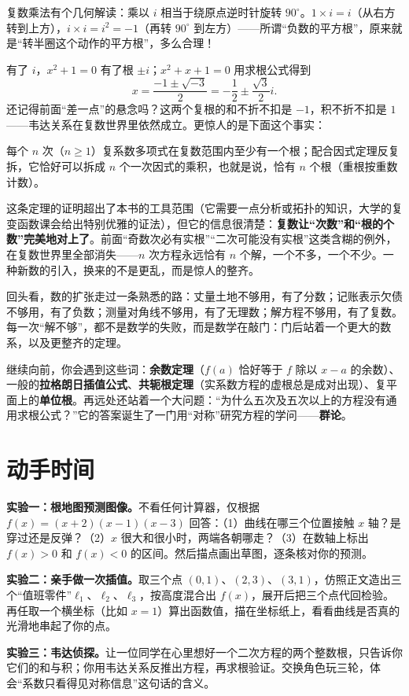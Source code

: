 复数乘法有个几何解读：乘以 $i$ 相当于绕原点逆时针旋转 $90^\circ$。$1\times i = i$（从右方转到上方），$i\times i = i^2 = -1$（再转 $90^\circ$ 到左方）——所谓“负数的平方根”，原来就是“转半圈这个动作的平方根”，多么合理！

有了 $i$，$x^2+1=0$ 有了根 $\pm i$；$x^2+x+1=0$ 用求根公式得到
\[
x=\frac{-1\pm\sqrt{-3}}{2}=-\frac{1}{2}\pm\frac{\sqrt{3}}{2}i.
\]
还记得前面“差一点”的悬念吗？这两个复根的和不折不扣是 $-1$，积不折不扣是 $1$——韦达关系在复数世界里依然成立。更惊人的是下面这个事实：

\begin{dingli}[代数基本定理]
每个 $n$ 次（$n\ge 1$）复系数多项式在复数范围内至少有一个根；配合因式定理反复拆，它恰好可以拆成 $n$ 个一次因式的乘积，也就是说，恰有 $n$ 个根（重根按重数计数）。
\end{dingli}

这条定理的证明超出了本书的工具范围（它需要一点分析或拓扑的知识，大学的复变函数课会给出特别优雅的证法），但它的信息很清楚：\textbf{复数让“次数”和“根的个数”完美地对上了}。前面“奇数次必有实根”“二次可能没有实根”这类含糊的例外，在复数世界里全部消失——$n$ 次方程永远恰有 $n$ 个解，一个不多，一个不少。一种新数的引入，换来的不是更乱，而是惊人的整齐。

回头看，数的扩张走过一条熟悉的路：丈量土地不够用，有了分数；记账表示欠债不够用，有了负数；测量对角线不够用，有了无理数；解方程不够用，有了复数。每一次“解不够”，都不是数学的失败，而是数学在敲门：门后站着一个更大的数系，以及更整齐的定理。

\begin{pandeng}
继续向前，你会遇到这些词：\textbf{余数定理}（$f(a)$ 恰好等于 $f$ 除以 $x-a$ 的余数）、一般的\textbf{拉格朗日插值公式}、\textbf{共轭根定理}（实系数方程的虚根总是成对出现）、复平面上的\textbf{单位根}。再远处还站着一个大问题：“为什么五次及五次以上的方程没有通用求根公式？”它的答案诞生了一门用“对称”研究方程的学问——\textbf{群论}。
\end{pandeng}

\section{动手时间}

\begin{shiyan}
\textbf{实验一：根地图预测图像。}不看任何计算器，仅根据 $f(x)=(x+2)(x-1)(x-3)$ 回答：（1）曲线在哪三个位置接触 $x$ 轴？是穿过还是反弹？（2）$x$ 很大和很小时，两端各朝哪走？（3）在数轴上标出 $f(x)>0$ 和 $f(x)<0$ 的区间。然后描点画出草图，逐条核对你的预测。

\textbf{实验二：亲手做一次插值。}取三个点 $(0,1)$、$(2,3)$、$(3,1)$，仿照正文造出三个“值班零件”$\ell_1$、$\ell_2$、$\ell_3$，按高度混合出 $f(x)$，展开后把三个点代回检验。再任取一个横坐标（比如 $x=1$）算出函数值，描在坐标纸上，看看曲线是否真的光滑地串起了你的点。

\textbf{实验三：韦达侦探。}让一位同学在心里想好一个二次方程的两个整数根，只告诉你它们的和与积；你用韦达关系反推出方程，再求根验证。交换角色玩三轮，体会“系数只看得见对称信息”这句话的含义。
\end{shiyan}

